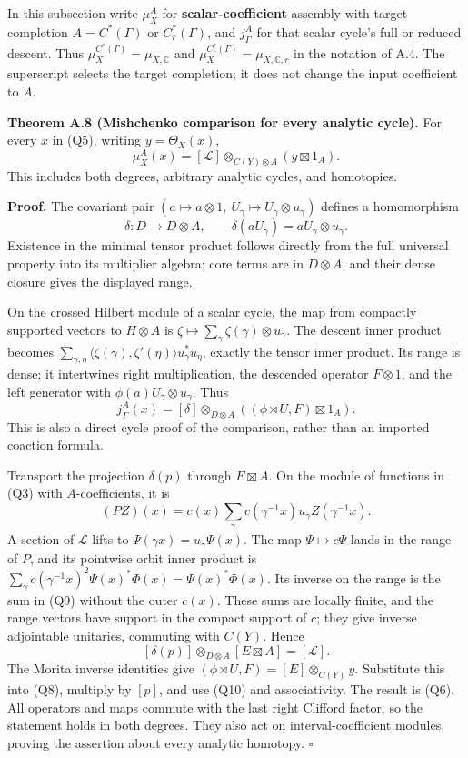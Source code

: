 \documentclass[
  11pt,
]{article}
\begin{document}
In this subsection write \(\mu_X^A\) for \textbf{scalar-coefficient}
assembly with target completion \(A=C^*(\Gamma)\) or \(C_r^*(\Gamma)\),
and \(j_\Gamma^A\) for that scalar cycle's full or reduced descent. Thus
\(\mu_X^{C^*(\Gamma)}=\mu_{X,\mathbb C}\) and
\(\mu_X^{C_r^*(\Gamma)}=\mu_{X,\mathbb C,r}\) in the notation of A.4.
The superscript selects the target completion; it does not change the
input coefficient to \(A\).

\textbf{Theorem A.8 (Mishchenko comparison for every analytic cycle).}
For every \(x\) in (Q5), writing \(y=\Theta_X(x)\), \[
 \mu_X^A(x)
    =[\mathcal L]\otimes_{C(Y)\otimes A}(y\boxtimes1_A).
 \tag{Q6}
\] This includes both degrees, arbitrary analytic cycles, and
homotopies.

\textbf{Proof.} The covariant pair
\((a\mapsto a\otimes1,\ U_\gamma\mapsto
U_\gamma\otimes u_\gamma)\) defines a homomorphism \[
 \delta:D\longrightarrow D\otimes A,\qquad
 \delta(aU_\gamma)=aU_\gamma\otimes u_\gamma .
 \tag{Q7}
\] Existence in the minimal tensor product follows directly from the
full universal property into its multiplier algebra; core terms are in
\(D\otimes A\), and their dense closure gives the displayed range.

On the crossed Hilbert module of a scalar cycle, the map from compactly
supported vectors to \(H\otimes A\) is
\(\zeta\mapsto\sum_\gamma\zeta(\gamma)\otimes u_\gamma\). The descent
inner product becomes
\(\sum_{\gamma,\eta}\langle\zeta(\gamma),\zeta'(\eta)\rangle
u_\gamma^*u_\eta\), exactly the tensor inner product. Its range is
dense; it intertwines right multiplication, the descended operator
\(F\otimes1\), and the left generator with
\(\phi(a)U_\gamma\otimes u_\gamma\). Thus \[
 j_\Gamma^A(x)=[\delta]\otimes_{D\otimes A}
                         ((\phi\rtimes U,F)\boxtimes1_A).
 \tag{Q8}
\] This is also a direct cycle proof of the comparison, rather than an
imported coaction formula.

Transport the projection \(\delta(p)\) through \(E\boxtimes A\). On the
module of functions in (Q3) with \(A\)-coefficients, it is \[
 (PZ)(x)=c(x)\sum_\gamma c(\gamma^{-1}x)
                   u_\gamma Z(\gamma^{-1}x).
 \tag{Q9}
\] A section of \(\mathcal L\) lifts to
\(\Psi(\gamma x)=u_\gamma\Psi(x)\). The map \(\Psi\mapsto c\Psi\) lands
in the range of \(P\), and its pointwise orbit inner product is
\(\sum_\gamma c(\gamma^{-1}x)^2\Psi(x)^*\Phi(x)=\Psi(x)^*\Phi(x)\). Its
inverse on the range is the sum in (Q9) without the outer \(c(x)\).
These sums are locally finite, and the range vectors have support in the
compact support of \(c\); they give inverse adjointable unitaries,
commuting with \(C(Y)\). Hence \[
 [\delta(p)]\otimes_{D\otimes A}[E\boxtimes A]=[\mathcal L].
 \tag{Q10}
\] The Morita inverse identities give
\((\phi\rtimes U,F)=[E]\otimes_{C(Y)}y\). Substitute this into (Q8),
multiply by \([p]\), and use (Q10) and associativity. The result is
(Q6). All operators and maps commute with the last right Clifford
factor, so the statement holds in both degrees. They also act on
interval-coefficient modules, proving the assertion about every analytic
homotopy. \(\square\)
\end{document}
